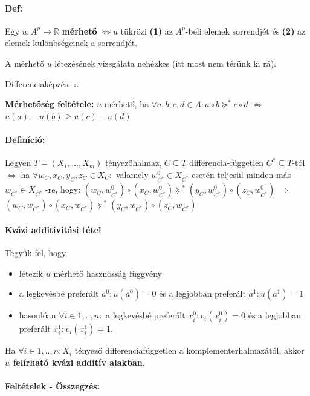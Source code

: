 \documentclass[a4paper,12pt]{article}
\begin{document}
\paragraph{Def:} Egy $u: A^p \rightarrow \mathbb{R}$ \textbf{mérhető} $\Leftrightarrow u$ tükrözi \textbf{(1)} az $A^p$-beli elemek sorrendjét és \textbf{(2)} az elemek különbségeinek a sorrendjét.

A mérhető $u$ létezésének vizsgálata nehézkes (itt most nem térünk ki rá).

Differenciaképzés: $\circ$.

\textbf{Mérhetőség feltétele:} $u$ mérhető, ha $\forall a,b,c,d \in A: a \circ b \succeq^* c \circ d$ $\Leftrightarrow$ $u(a)-u(b) \geq u(c)-u(d)$

\paragraph{Definíció: } Legyen $T=(X_1,...,X_m)$ tényezőhalmaz, $C \subseteq T$ differencia-független $C^*\subseteq T $-tól $\Leftrightarrow$ ha $\forall w_C,x_C,y_C,z_C \in X_C:$ valamely $w_{C^*}^0 \in X_{C^*}$ esetén teljesül minden más $w_{C^*} \in X_{C^*}$ -re, hogy: $(w_C, w_{C^*}^0) \circ (x_C, w_{C^*}^0) \succeq^* (y_C, w_{C^*}^0) \circ (z_C, w_{C^*}^0)$  $\Rightarrow$ $(w_C, w_{C^*}) \circ (x_C, w_{C^*}) \succeq^* (y_C, w_{C^*}) \circ (z_C, w_{C^*})$

\paragraph{Kvázi additivitási tétel} Tegyük fel, hogy
\begin{itemize}
\item létezik $u$ mérhető hasznosság függvény
\item a legkevésbé preferált $a^0: u(a^0) = 0$ és a legjobban preferált $a^1: u(a^1)=1$
\item hasonlóan $\forall i \in 1,..,n : $ a legkevésbé preferált $x_i^0: v_i(x_i^0) = 0$ és a legjobban preferált $x_i^1: v_i(x_i^1)=1$.
\end{itemize}
Ha $\forall i \in 1,..,n : X_i$ tényező differenciafüggetlen a komplementerhalmazától, akkor \textbf{$u$ felírható kvázi additív alakban}.


\paragraph{Feltételek - Összegzés:}
\end{document}
